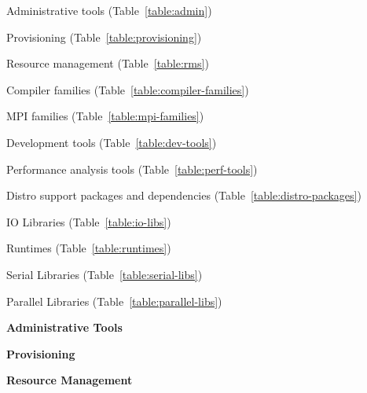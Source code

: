 \vspace*{0.1cm}

\begin{itemize*}
\item Administrative tools (Table~\ref{table:admin})
\item Provisioning (Table~\ref{table:provisioning})
\item Resource management (Table~\ref{table:rms})
\item Compiler families (Table~\ref{table:compiler-families})
\item MPI families (Table~\ref{table:mpi-families})
\item Development tools (Table~\ref{table:dev-tools})
\item Performance analysis tools (Table~\ref{table:perf-tools})
\item Distro support packages and dependencies (Table~\ref{table:distro-packages})
\item IO Libraries (Table~\ref{table:io-libs})
\item Runtimes (Table~\ref{table:runtimes})
\item Serial Libraries (Table~\ref{table:serial-libs})
\item Parallel Libraries (Table~\ref{table:parallel-libs})
\end{itemize*}

\newcommand{\firstColWidth}{4.9cm}
\newcommand{\secondColWidth}{1.25cm}

\vspace*{1.0cm}

\begin{table}[h]
\caption{\bf Administrative Tools} \vspace*{\captionSpace{}} \label{table:admin}

\end{table}
\vspace*{0.5cm}

\renewcommand{\firstColWidth}{4.5cm}
\renewcommand{\secondColWidth}{2.0cm}


\begin{table}[h!]
\caption{\bf Provisioning} \vspace*{\captionSpace{}} \label{table:provisioning}

\vspace*{\tabSpaceBot{}}
\end{table} 

\begin{table}[h!]
\caption{\bf Resource Management} \vspace*{\captionSpace{}} \label{table:rms}

\vspace*{\tabSpaceBot{}}
\end{table}

